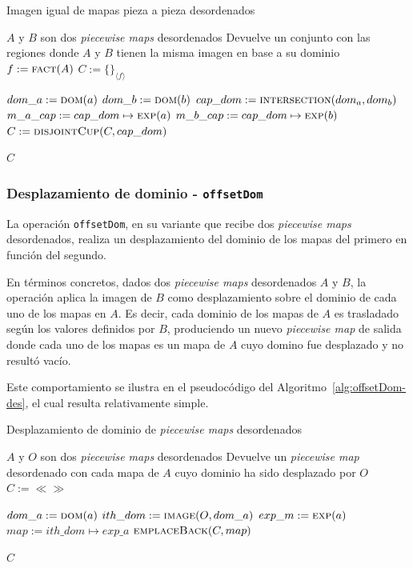 \begin{algorithm}
\caption{Imagen igual de mapas pieza a pieza desordenados}
\label{alg:equalImage-des}
\begin{algorithmic}[1]
\Require $A$ y $B$ son dos \textit{piecewise maps} desordenados
\Ensure Devuelve un conjunto con las regiones donde $A$ y $B$ tienen la misma imagen en base a su dominio
  \State $f := \Call{fact}{A}$
  \State $C := \{\}_{\langle f \rangle}$

      \State $dom\_a := \Call{dom}{a}$
      \State $dom\_b := \Call{dom}{b}$
      \State $cap\_dom := \Call{intersection}{dom_a, dom_b}$
        \State $m\_a\_cap := cap\_dom \mapsto \Call{exp}{a}$
        \State $m\_b\_cap := cap\_dom \mapsto \Call{exp}{b}$
          \State $C := \Call{disjointCup}{C, cap\_dom}$
        \EndIf
      \EndIf
    \EndFor
  \EndFor

  \State \Return $C$
\EndFunction
\end{algorithmic}
\end{algorithm}

\subsubsection{Desplazamiento de dominio - \texttt{offsetDom}}

La operación \texttt{offsetDom}, en su variante que recibe dos \textit{piecewise maps} desordenados, realiza un desplazamiento del dominio de los mapas del primero en función del segundo. 

En términos concretos, dados dos \textit{piecewise maps} desordenados $A$ y $B$, la operación aplica la imagen de $B$ como desplazamiento sobre el dominio de cada uno de los mapas en $A$. Es decir, cada dominio de los mapas de $A$ es trasladado según los valores definidos por $B$, produciendo un nuevo \textit{piecewise map} de salida donde cada uno de los mapas es un mapa de $A$ cuyo domino fue desplazado y no resultó vacío.

Este comportamiento se ilustra en el pseudocódigo del Algoritmo~\ref{alg:offsetDom-des}, el cual resulta relativamente simple.


\begin{algorithm}
\caption{Desplazamiento de dominio  de \textit{piecewise maps} desordenados}
\label{alg:offsetDom-des}
\begin{algorithmic}[1]
\Require $A$ y $O$ son dos \textit{piecewise maps} desordenados
\Ensure Devuelve un \textit{piecewise map} desordenado con cada mapa de $A$ cuyo dominio ha sido desplazado por $O$
  \State $C := \ll\gg$ 

    \State $dom\_a := \Call{dom}{a}$
    \State $ith\_dom := \Call{image}{O, dom\_a}$
    \State $exp\_m := \Call{exp}{a}$
    \State $map := ith\_dom \mapsto exp\_a$
    \State $\Call{emplaceBack}{C, map}$
  \EndFor

  \State \Return $C$
\EndFunction
\end{algorithmic}
\end{algorithm}


